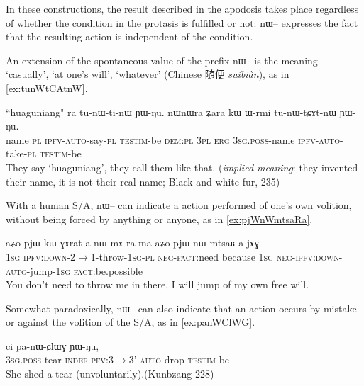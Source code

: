 \documentclass[oldfontcommands,oneside,a4paper,11pt]{article}
\newcommand{\ipa}[1]{{\phon \mbox{#1}}} %
\newcommand{\zh}[1]{{\cn #1}}
\begin{document}
In these constructions, the result described in the apodosis takes place regardless of whether the condition in the protasis is fulfilled or not: \ipa{nɯ--} expresses the fact that the resulting action is independent of the condition.

An extension of the spontaneous value of the prefix \ipa{nɯ--} is the meaning `casually', `at one's will', `whatever' (Chinese \zh{随便} \textit{suíbiàn}), as in \ref{ex:tunWtCAtnW}. 

\begin{exe}
\ex \label{ex:tunWtCAtnW}
\gll
``huaguniang" \ipa{ra}  	\ipa{tu-nɯ-ti-nɯ}  	\ipa{ɲɯ-ŋu.}  	\ipa{nɯnɯra}  	\ipa{ʑara}  	\ipa{kɯ}  	\ipa{ɯ-rmi}  	\ipa{tu-nɯ-tɕɤt-nɯ}  	\ipa{ɲɯ-ŋu.}  \\
name \textsc{pl}	\textsc{ipfv-auto}-say-\textsc{pl}	\textsc{testim}-be	\textsc{dem:pl}	\textsc{3pl}	\textsc{erg}	\textsc{3sg.poss}-name	\textsc{ipfv-auto}-take-\textsc{pl}	\textsc{testim}-be\\
\glt They say `huaguniang', they call them like that. (\textit{implied meaning}: they invented their name, it is not their real name; Black and white fur, 235)
\end{exe}


With a human S/A, \ipa{nɯ--} can indicate a action performed of one's own volition, without being forced by anything or anyone, as in \ref{ex:pjWnWmtsaRa}.

\begin{exe}
\ex \label{ex:pjWnWmtsaRa}
\gll 
\ipa{aʑo} 	\ipa{pjɯ-kɯ-ɣɤrat-a-nɯ} 	\ipa{mɤ-ra} 	\ipa{ma} 	\ipa{aʑo} 	\ipa{pjɯ-nɯ-mtsaʁ-a} 	\ipa{jɤɣ} \\
\textsc{1sg} \textsc{ipfv:down}-2$\rightarrow$1-throw-\textsc{1sg-pl} \textsc{neg-fact}:need because \textsc{1sg} \textsc{neg-ipfv:down-auto}-jump-\textsc{1sg} \textsc{fact}:be.possible \\
\glt You don't need to throw me in there, I will jump of my own free will.
\end{exe}

Somewhat paradoxically, \ipa{nɯ--} can also indicate that an action occurs by mistake or against the volition of the S/A, as in \ref{ex:panWClWG}.

\begin{exe}
\ex \label{ex:panWClWG}
\gll \ipa{ɯ-qom} 	\ipa{ci} 	\ipa{pa-nɯ-ɕlɯɣ} 	\ipa{ɲɯ-ŋu,} \\
\textsc{3sg.poss}-tear \textsc{indef} \textsc{pfv:3$\rightarrow$3'-auto}-drop \textsc{testim}-be \\
\glt She shed a tear (unvoluntarily).(Kunbzang 228)
\end{exe}
\end{document}
